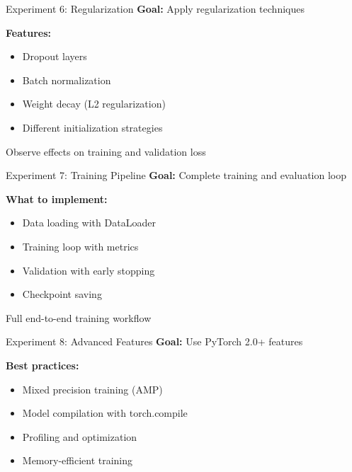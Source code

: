 \documentclass[aspectratio=169,10pt]{beamer}
\begin{document}
\begin{frame}{Experiment 6: Regularization}
\textbf{Goal:} Apply regularization techniques

\textbf{Features:}
\begin{itemize}
    \item Dropout layers
    \item Batch normalization
    \item Weight decay (L2 regularization)
    \item Different initialization strategies
\end{itemize}

Observe effects on training and validation loss
\end{frame}

\begin{frame}{Experiment 7: Training Pipeline}
\textbf{Goal:} Complete training and evaluation loop

\textbf{What to implement:}
\begin{itemize}
    \item Data loading with DataLoader
    \item Training loop with metrics
    \item Validation with early stopping
    \item Checkpoint saving
\end{itemize}

Full end-to-end training workflow
\end{frame}

\begin{frame}{Experiment 8: Advanced Features}
\textbf{Goal:} Use PyTorch 2.0+ features

\textbf{Best practices:}
\begin{itemize}
    \item Mixed precision training (AMP)
    \item Model compilation with torch.compile
    \item Profiling and optimization
    \item Memory-efficient training
\end{itemize}
\end{frame}
\end{document}
